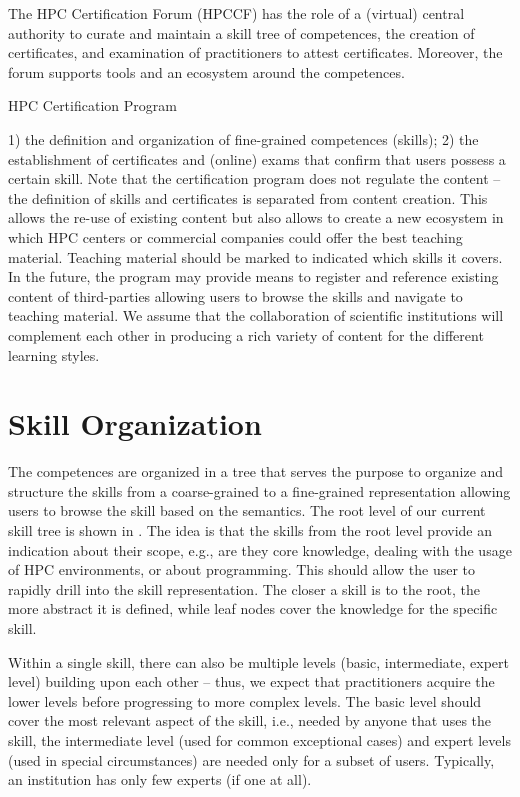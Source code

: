 \documentclass[jocse]{jocseart}
\newcommand{\jk}[1]{\todo[inline]{TODO: #1}}
\begin{document}
The HPC Certification Forum (HPCCF) has the role of a (virtual) central authority to curate and maintain a skill tree of competences, the creation of certificates, and examination of practitioners to attest certificates.
Moreover, the forum supports tools and an ecosystem around the competences.

HPC Certification Program

\jk{Integrate}

1) the definition and organization of fine-grained competences (skills);
2) the establishment of certificates and (online) exams that confirm that users possess a certain skill.
Note that the certification program does not regulate the content -- the definition of skills and certificates is separated from content creation.
This allows the re-use of existing content but also allows to create a new ecosystem in which HPC centers or commercial companies could offer the best teaching material.
Teaching material should be marked to indicated which skills it covers.
In the future, the program may provide means to register and reference existing content of third-parties allowing users to browse the skills and navigate to teaching material.
We assume that the collaboration of scientific institutions will complement each other in producing a rich variety of content for the different learning styles.



\section{Skill Organization}

The competences are organized in a tree that serves the purpose to organize and structure the skills from a coarse-grained to a fine-grained representation allowing users to browse the skill based on the semantics.
The root level of our current skill tree is shown in .
The idea is that the skills from the root level provide an indication about their scope,
e.g., are they core knowledge, dealing with the usage of HPC environments, or about programming.
This should allow the user to rapidly drill into the skill representation.
The closer a skill is to the root, the more abstract it is defined, while leaf nodes cover the knowledge for the specific skill.


Within a single skill, there can also be multiple levels (basic, intermediate, expert level) building upon each other -- thus, we expect that practitioners acquire the lower levels before progressing to more complex levels.
The basic level should cover the most relevant aspect of the skill, i.e., needed by anyone that uses the skill, the intermediate level (used for common exceptional cases) and expert levels (used in special circumstances)  are needed only for a subset of users.
Typically, an institution has only few experts (if one at all).
\end{document}
